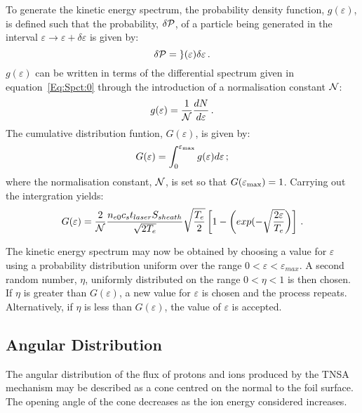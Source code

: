 To generate the kinetic energy spectrum, the probability density
function, $g(\varepsilon)$, is defined such that the probability,
$\delta \cal{P}$, of a particle being generated in the interval
$\varepsilon \rightarrow \varepsilon + \delta \varepsilon$ is given
by:
\begin{equation}
   \delta \cal{P} = g(\varepsilon) \delta \varepsilon \, .
\end{equation}
$g(\varepsilon)$ can be written in terms of the differential spectrum
given in equation~\ref{Eq:Spct:0} through the introduction of a
normalisation constant $\cal{N}$:
\begin{equation}
  g(\varepsilon) = \frac{1}{\cal{N}} \frac{dN}{d\varepsilon} \, .
\end{equation}
The cumulative distribution funtion, $G(\varepsilon)$, is given by:
\begin{equation}
  G(\varepsilon) = \int_0^{\varepsilon_{\rm max}} g(\varepsilon)
                                               d\varepsilon \,;
\end{equation}
where the normalisation constant, $\cal{N}$, is set so that
$G(\varepsilon_{\rm max}) = 1$.
Carrying out the intergration yields:
\begin{equation}
  G(\varepsilon) = \frac{2}{\cal{N}}
                   \frac{n_{e0} c_{s} t_{laser} S_{sheath}} {\sqrt{2T_{e}}}
                   \sqrt{\frac{T_{e}}{2}}
                   \left[
                     1 - \left(exp(- \sqrt{\frac{2\varepsilon}{T_{e}}}\right)
                   \right] \, .
\end{equation}

The kinetic energy spectrum may now be obtained by choosing a value
for $\varepsilon$ using a probability distribution uniform over the
range $0 < \varepsilon < \varepsilon_{max}$.   
A second random number, $\eta$, uniformly distributed on the range
$0 < \eta < 1$ is then chosen.
If $\eta$ is greater than $G(\varepsilon)$, a new value for
$\varepsilon$ is chosen and the process repeats.
Alternatively, if $\eta$ is less than $G(\varepsilon)$, the value of
$\varepsilon$ is accepted. 

\subsection{Angular Distribution}

The angular distribution of the flux of protons and ions produced by
the TNSA mechanism may be described as a cone centred on the normal to
the foil surface.
The opening angle of the cone decreases as the ion energy considered
increases.


